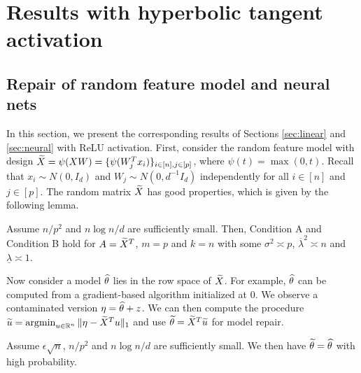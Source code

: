 
\appendix

\section{Results with hyperbolic tangent activation}


\subsection{Repair of random feature model and neural nets} \label{app:results}

In this section, we present the corresponding results of Sections \ref{sec:linear} and \ref{sec:neural} with ReLU activation. First, consider the random feature model with design $\widetilde{X}=\psi(XW)=\{\psi(W_j^Tx_i)\}_{i\in[n],j\in[p]}$, where $\psi(t)=\max(0,t)$. Recall that $x_i\sim N(0,I_d)$ and $W_j\sim N(0,d^{-1}I_d)$ independently for all $i\in[n]$ and $j\in[p]$. The random matrix $\widetilde{X}$ has good properties, which is given by the following lemma.
\begin{lemma}\label{lem:design-rf-relu}
Assume $n/p^2$ and $n\log n/d$ are sufficiently small. Then, Condition A and Condition B hold for $A=\widetilde{X}^T$, $m=p$ and $k=n$ with some $\sigma^2\asymp p$, $\overline{\lambda}^2\asymp n$ and $\underline{\lambda}\asymp 1$.
\end{lemma}

Now consider a model $\widehat{\theta}$ lies in the row space of $\widetilde{X}$. For example, $\widehat{\theta}$ can be computed from a gradient-based algorithm initialized at $0$. We observe a contaminated version $\eta=\widehat{\theta}+z$.
We can then compute the procedure $\widetilde{u}=\mathop{\rm argmin}_{u\in\mathbb{R}^n}\|\eta-\widetilde{X}^Tu\|_1$ and use $\widetilde{\theta}=\widetilde{X}^T\widetilde{u}$ for model repair.

\begin{corollary}\label{cor:repair-rf-relu}
Assume $\epsilon\sqrt{n}$, $n/p^2$ and $n\log n/d$ are sufficiently small. We then have $\widetilde{\theta}=\widehat{\theta}$ with high probability.
\end{corollary}


